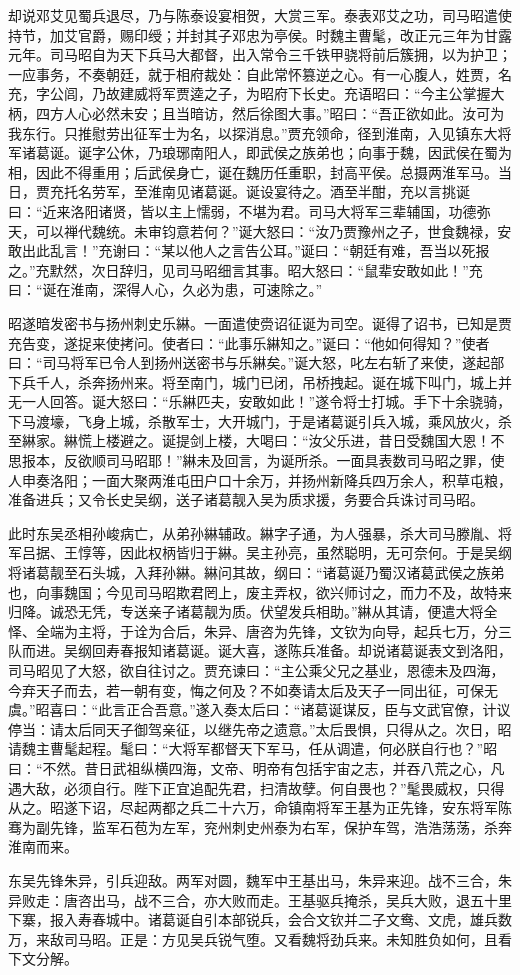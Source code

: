 却说邓艾见蜀兵退尽，乃与陈泰设宴相贺，大赏三军。泰表邓艾之功，司马昭遣使持节，加艾官爵，赐印绶；并封其子邓忠为亭侯。时魏主曹髦，改正元三年为甘露元年。司马昭自为天下兵马大都督，出入常令三千铁甲骁将前后簇拥，以为护卫；一应事务，不奏朝廷，就于相府裁处：自此常怀篡逆之心。有一心腹人，姓贾，名充，字公闾，乃故建威将军贾逵之子，为昭府下长史。充语昭曰：“今主公掌握大柄，四方人心必然未安；且当暗访，然后徐图大事。”昭曰：“吾正欲如此。汝可为我东行。只推慰劳出征军士为名，以探消息。”贾充领命，径到淮南，入见镇东大将军诸葛诞。诞字公休，乃琅琊南阳人，即武侯之族弟也；向事于魏，因武侯在蜀为相，因此不得重用；后武侯身亡，诞在魏历任重职，封高平侯。总摄两淮军马。当日，贾充托名劳军，至淮南见诸葛诞。诞设宴待之。酒至半酣，充以言挑诞曰：“近来洛阳诸贤，皆以主上懦弱，不堪为君。司马大将军三辈辅国，功德弥天，可以禅代魏统。未审钧意若何？”诞大怒曰：“汝乃贾豫州之子，世食魏禄，安敢出此乱言！”充谢曰：“某以他人之言告公耳。”诞曰：“朝廷有难，吾当以死报之。”充默然，次日辞归，见司马昭细言其事。昭大怒曰：“鼠辈安敢如此！”充曰：“诞在淮南，深得人心，久必为患，可速除之。”

昭遂暗发密书与扬州刺史乐綝。一面遣使赍诏征诞为司空。诞得了诏书，已知是贾充告变，遂捉来使拷问。使者曰：“此事乐綝知之。”诞曰：“他如何得知？”使者曰：“司马将军已令人到扬州送密书与乐綝矣。”诞大怒，叱左右斩了来使，遂起部下兵千人，杀奔扬州来。将至南门，城门已闭，吊桥拽起。诞在城下叫门，城上并无一人回答。诞大怒曰：“乐綝匹夫，安敢如此！”遂令将士打城。手下十余骁骑，下马渡壕，飞身上城，杀散军士，大开城门，于是诸葛诞引兵入城，乘风放火，杀至綝家。綝慌上楼避之。诞提剑上楼，大喝曰：“汝父乐进，昔日受魏国大恩！不思报本，反欲顺司马昭耶！”綝未及回言，为诞所杀。一面具表数司马昭之罪，使人申奏洛阳；一面大聚两淮屯田户口十余万，并扬州新降兵四万余人，积草屯粮，准备进兵；又令长史吴纲，送子诸葛靓入吴为质求援，务要合兵诛讨司马昭。

此时东吴丞相孙峻病亡，从弟孙綝辅政。綝字子通，为人强暴，杀大司马滕胤、将军吕据、王惇等，因此权柄皆归于綝。吴主孙亮，虽然聪明，无可奈何。于是吴纲将诸葛靓至石头城，入拜孙綝。綝问其故，纲曰：“诸葛诞乃蜀汉诸葛武侯之族弟也，向事魏国；今见司马昭欺君罔上，废主弄权，欲兴师讨之，而力不及，故特来归降。诚恐无凭，专送亲子诸葛靓为质。伏望发兵相助。”綝从其请，便遣大将全怿、全端为主将，于诠为合后，朱异、唐咨为先锋，文钦为向导，起兵七万，分三队而进。吴纲回寿春报知诸葛诞。诞大喜，遂陈兵准备。却说诸葛诞表文到洛阳，司马昭见了大怒，欲自往讨之。贾充谏曰：“主公乘父兄之基业，恩德未及四海，今弃天子而去，若一朝有变，悔之何及？不如奏请太后及天子一同出征，可保无虞。”昭喜曰：“此言正合吾意。”遂入奏太后曰：“诸葛诞谋反，臣与文武官僚，计议停当：请太后同天子御驾亲征，以继先帝之遗意。”太后畏惧，只得从之。次日，昭请魏主曹髦起程。髦曰：“大将军都督天下军马，任从调遣，何必朕自行也？”昭曰：“不然。昔日武祖纵横四海，文帝、明帝有包括宇宙之志，并吞八荒之心，凡遇大敌，必须自行。陛下正宜追配先君，扫清故孽。何自畏也？”髦畏威权，只得从之。昭遂下诏，尽起两都之兵二十六万，命镇南将军王基为正先锋，安东将军陈骞为副先锋，监军石苞为左军，兖州刺史州泰为右军，保护车驾，浩浩荡荡，杀奔淮南而来。

东吴先锋朱异，引兵迎敌。两军对圆，魏军中王基出马，朱异来迎。战不三合，朱异败走：唐咨出马，战不三合，亦大败而走。王基驱兵掩杀，吴兵大败，退五十里下寨，报入寿春城中。诸葛诞自引本部锐兵，会合文钦并二子文鸯、文虎，雄兵数万，来敌司马昭。正是：方见吴兵锐气堕。又看魏将劲兵来。未知胜负如何，且看下文分解。